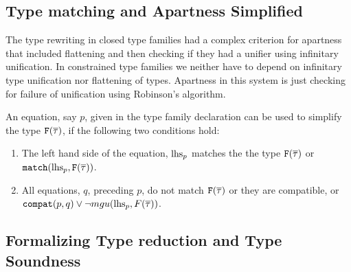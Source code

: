 \documentclass[format=acmsmall,manuscript,review,screen,nonacm,margin=1in,11pt]{acmart}
\begin{document}

\subsection{Type matching and Apartness Simplified}
The type rewriting in closed type families had a complex criterion for apartness that included
flattening and then checking if they had a unifier using infinitary unification.
In constrained type families we neither have to depend on infinitary type unification nor flattening of types. 
Apartness in this system is just checking for failure of unification using
Robinson's algorithm.

\begin{defn}\label{def:ctf-simpl-1}
  An equation, say $p$, given in the type family declaration can be used to simplify the type
  $\texttt{F}(\overline{\tau})$, if the following two conditions hold:
  \begin{enumerate}
  \item The left hand side of the equation, $\text{lhs}_{p}$  matches the the type $\texttt{F}(\overline{\tau})$
    or $\texttt{match}(\text{lhs}_{p}, \texttt{F}(\overline{\tau}))$.
  \item All equations, $q$, preceding $p$, do not match $\texttt{F}(\overline{\tau})$ or
    they are compatible, or $\texttt{compat}(p, q) \lor \lnot mgu(\text{lhs}_{p},F(\overline{\tau}))$.
  \end{enumerate}
\end{defn}

\subsection{Formalizing Type reduction and Type Soundness}\label{subsec:tf-constrained-formal}
\end{document}
